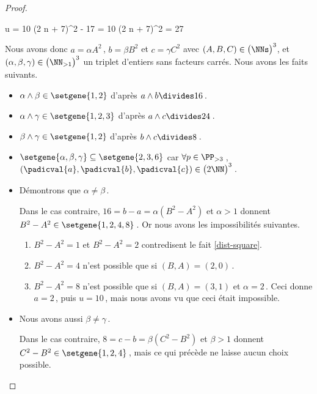 \begin{proof}
\begin{itemize}
		\medskip
		\noindent\!\!%
   		\begin{stepcalc}[style = sar, ope = \iff]
			u = 10
		\explnext{}
			(2 n + 7)^2 - 17 = 10
		\explnext*{$27 \notin \NNsquare$}{}
			(2 n + 7)^2 = 27
		\end{stepcalc}
	\end{itemize}


	Nous avons donc $a = \alpha A^2$\,, $b = \beta B^2$ et $c = \gamma C^2$ avec $(A, B, C) \in \big( \NNs \big)^3$, et $(\alpha, \beta, \gamma) \in \big( \NN_{>1} \big)^3$ un triplet d'entiers sans facteurs carrés.
	Nous avons les faits suivants.
    
    \begin{itemize}
		\item $\alpha \wedge \beta \in \setgene{1, 2}$
		d'après $a \wedge b \divides 16$\,.

		\item $\alpha \wedge \gamma \in \setgene{1, 2, 3}$
		d'après $a \wedge c \divides 24$\,.

		\item $\beta \wedge \gamma \in \setgene{1, 2}$
		d'après $b \wedge c \divides 8$\,.

		\item $\setgene{\alpha, \beta, \gamma} \subseteq \setgene{2, 3, 6}$
		car $\forall p \in \PP_{>3}$\,, $(\padicval{a}, \padicval{b}, \padicval{c}) \in \big( 2 \NN \big)^3$\,. 
		

		\item Démontrons que $\alpha \neq \beta$\,. 
		
		\noindent
		Dans le cas contraire, $16 = b - a = \alpha(B^2 - A^2)$ et $\alpha > 1$ donnent $B^2 - A^2 \in \setgene{1, 2, 4, 8}$\,.
		Or nous avons les impossibilités suivantes.
		\begin{enumerate}
			\item $B^2 - A^2 = 1$  et $B^2 - A^2 = 2$ contredisent le fait \ref{dist-square}.
			\item $B^2 - A^2 = 4$ n'est possible que si $(B, A) = (2, 0)$\,.
			\item $B^2 - A^2 = 8$ n'est possible que si $(B, A) = (3, 1)$ et $\alpha = 2$\,.
			Ceci donne $a = 2$\,, puis $u = 10$\,, mais nous avons vu que ceci était impossible.
		\end{enumerate}
		

		\item Nous avons aussi $\beta \neq \gamma$\,. 
		
		\noindent
		Dans le cas contraire, $8 = c - b = \beta(C^2 - B^2)$ et $\beta > 1$ donnent $C^2 - B^2 \in \setgene{1, 2, 4}$\,, mais ce qui précède ne laisse aucun choix possible.
		


\end{itemize}
\end{proof}
